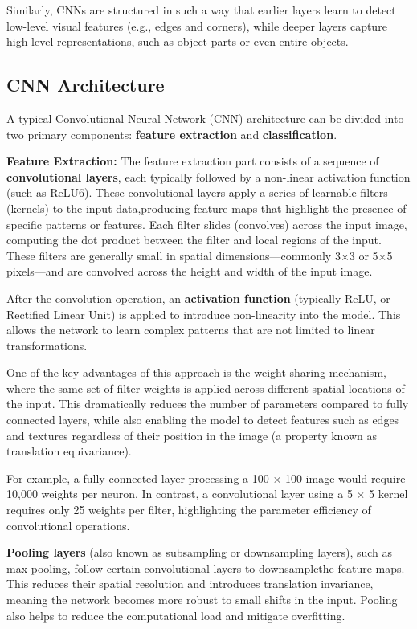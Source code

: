 Similarly, CNNs are structured in such a way that earlier layers learn to detect low-level visual features (e.g., edges and corners), while deeper layers capture high-level representations, such as object parts or even entire objects.


\subsection{CNN Architecture}

A typical Convolutional Neural Network (CNN) architecture can be divided into two primary components: \textbf{feature extraction} and \textbf{classification}.

\textbf{Feature Extraction:}
\newline
The feature extraction part consists of a sequence of \textbf{convolutional layers}, each typically followed by a non-linear activation function (such as ReLU6). These convolutional layers apply a series of learnable filters (kernels) to the input data,producing feature maps that highlight the presence of specific patterns or features. Each filter slides (convolves) across the input image, computing the dot product between the filter and local regions of the input. These filters are generally small in spatial dimensions—commonly 3×3 or 5×5 pixels—and are convolved across the height and width of the input image.

After the convolution operation, an \textbf{activation function }(typically ReLU, or Rectified Linear Unit) is applied to introduce non-linearity into the model. This allows the network to learn complex patterns that are not limited to linear transformations.

One of the key advantages of this approach is the weight-sharing mechanism, where the same set of filter weights is applied across different spatial locations of the input. This dramatically reduces the number of parameters compared to fully connected layers, while also enabling the model to detect features such as edges and textures regardless of their position in the image (a property known as translation equivariance).

For example, a fully connected layer processing a 100 × 100 image would require 10,000 weights per neuron. In contrast, a convolutional layer using a 5 × 5 kernel requires only 25 weights per filter, highlighting the parameter efficiency of convolutional operations.

\textbf{Pooling layers} (also known as subsampling or downsampling layers), such as max pooling, follow certain convolutional layers to downsamplethe feature maps. This reduces their spatial resolution and introduces translation invariance, meaning the network becomes more robust to small shifts in the input. Pooling also helps to reduce the computational load and mitigate overfitting.

